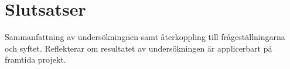 \section{Slutsatser}
\label{sec:axel-conclusion}

Sammanfattning av undersökningnen samt återkoppling till frågeställningarna och syftet. Reflekterar om resultatet av undersökningen är applicerbart på framtida projekt.
